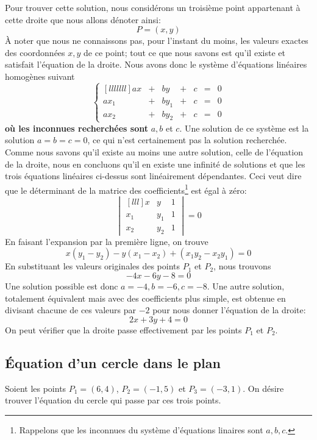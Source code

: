 Pour trouver cette solution, nous considérons un troisième point appartenant à cette
droite que nous allons dénoter ainsi:
\[
P = (x, y)
\]
À noter que nous ne connaissons pas, pour l'instant du moins, les valeurs
exactes des coordonnées $x, y$ de ce point; tout ce que nous savons est qu'il
existe et satisfait l'équation de la droite.   Nous avons donc le système d'équations
linéaires homogènes suivant
\[
\left\{
\begin{matrix}[lllllll]
ax &+& by &+& c &=& 0 \\
ax_1 &+& by_1 &+& c &=& 0 \\
ax_2 &+& by_2 &+& c &=& 0
\end{matrix}
\right.
\]
\textbf{où les inconnues recherchées sont } $a, b$ et $c$.  Une solution de ce système
est la solution $a=b=c=0$, ce qui n'est certainement pas la solution recherchée.
Comme nous savons qu'il existe  au moins une autre solution, celle de l'équation de la droite,
nous en concluons qu'il en existe une infinité de solutions et que les trois équations
linéaires ci-dessus sont linéairement dépendantes.  Ceci veut dire que le déterminant
de la matrice des 
coefficients\footnote{Rappelons que les inconnues du système d'équations linaires sont $a,b,c$.} est égal à zéro:
\[
\begin{vmatrix}[lll]
x & y & 1 \\
x_1 & y_1 & 1 \\
x_2 & y_2 & 1
\end{vmatrix} = 0
\]
En faisant l'expansion par la première ligne, on trouve
\[
x(y_1 - y_2) -y(x_1-x_2) + (x_1 y_2 - x_2 y_1) = 0
\]
En substituant les valeurs originales des points $P_1$ et $P_2$, nous trouvons
\[
-4x -6y -8 = 0
\]
Une solution possible est donc $a=-4, b=-6, c=-8$.  Une autre solution, 
totalement équivalent mais avec des coefficients plus simple, est
obtenue en divisant chacune de ces valeurs par $-2$ pour nous donner l'équation de la
droite:
\[
2x+3y+4 = 0
\]
On peut vérifier que la droite passe effectivement par les points $P_1$ et $P_2$.

\subsection{Équation d'un cercle dans le plan}

Soient les points $P_1 = (6,4)$, $P_2 = (-1,5)$ et $P_3 = (-3,1)$.  On désire
trouver l'équation du cercle qui passe par ces trois points.

